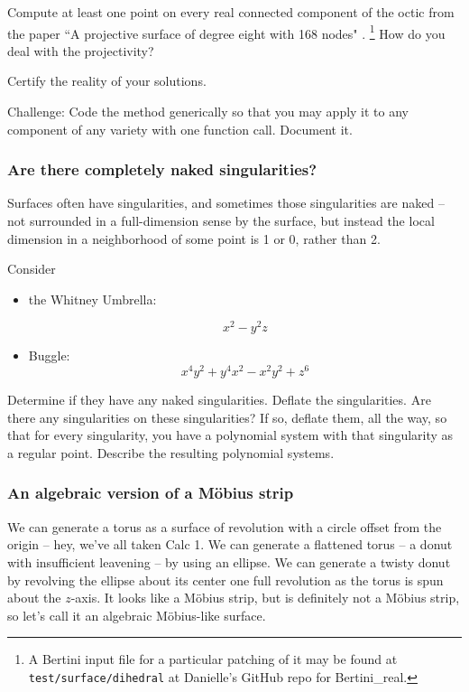\documentclass[letter,portrait]{article}
\newcommand{\1}{{\tt \_1}}
\newcommand{\2}{{\tt \_2}}
\begin{document}
Compute at least one point on every real connected component of the octic from the paper ``A projective surface of degree eight with 168 nodes" \cite{endrass1995projective}.%
\footnote{A Bertini input file for a particular patching of it may be found at {\tt test/surface/dihedral} at Danielle's GitHub repo for Bertini\_real.}
How do you deal with the projectivity? 

Certify the reality of your solutions.

Challenge: Code the method generically so that you may apply it to any component of any variety with one function call.  Document it.






\subsubsection{Are there completely naked singularities?}

Surfaces often have singularities, and sometimes those singularities are naked -- not surrounded in a full-dimension sense by the surface, but instead the local dimension in a neighborhood of some point is 1 or 0, rather than 2.

Consider 
\begin{itemize}
\item the Whitney Umbrella:

\[
x^2 - y^2z
\]

\item Buggle:
\[
x^4y^2+y^4x^2-x^2y^2 + z^6
\]
\end{itemize}


Determine if they have any naked singularities.  Deflate the singularities.  Are there any singularities on these singularities?  If so, deflate them, all the way, so that for every singularity, you have a polynomial system with that singularity as a regular point.  Describe the resulting polynomial systems.







\subsubsection{An algebraic version of a M\"obius strip}

We can generate a torus as a surface of revolution with a circle offset from the origin -- hey, we've all taken Calc 1.  We can generate a flattened torus -- a donut with insufficient leavening -- by using an ellipse.  We can generate a twisty donut by revolving the ellipse about its center one full revolution as the torus is spun about the $z$-axis.  It looks like a M\"obius strip, but is definitely not a M\"obius strip, so let's call it an algebraic M\"obius-like surface.  
\end{document}
